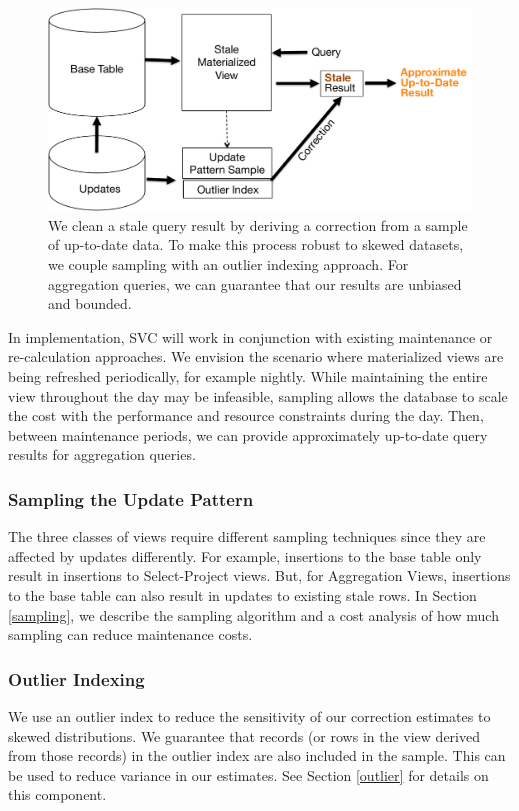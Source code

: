 \begin{figure}[h]
\centering
 \includegraphics[scale=0.35]{figs/sys-arch.pdf}
 \caption{We clean a stale query result by deriving a correction from a sample of up-to-date data. To make this process robust to skewed datasets, we couple sampling with an outlier indexing approach. For aggregation queries, we can guarantee that our results are unbiased and bounded. \label{sys-arch}}
\end{figure}

In implementation, SVC will work in conjunction with existing maintenance or re-calculation approaches.
We envision the scenario where materialized views are being refreshed periodically, for example nightly.
While maintaining the entire view throughout the day may be infeasible, sampling allows the database to scale the cost with the performance and resource constraints during the day.
Then, between maintenance periods, we can provide approximately up-to-date query results for aggregation queries.

\subsubsection{Sampling the Update Pattern}
The three classes of views require different sampling techniques since they are affected by updates differently.
For example, insertions to the base table only result in insertions to Select-Project views.
But, for Aggregation Views, insertions to the base table can also result in updates to existing stale rows.
In Section \ref{sampling}, we describe the sampling algorithm and a cost analysis of how much sampling can reduce maintenance costs.

\subsubsection{Outlier Indexing}
We use an outlier index to reduce the sensitivity of our correction estimates to skewed distributions. 
We guarantee that records (or rows in the view derived from those records) 
in the outlier index are also included in the sample.
This can be used to reduce variance in our estimates.
See Section \ref{outlier} for details on this component.

